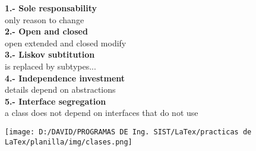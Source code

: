 \documentclass[11pt]{beamer}
\begin{document}
\begin{frame}
\textbf{1.- Sole responsability}\\
\textcolor{textoColor}{only reason to change}\\
\textbf{2.- Open and closed}\\
\textcolor{urlColor}{open extended and closed modify}\\
\textbf{3.- Liskov subtitution}\\
\textcolor{urlColor}{
is replaced by subtypes...}\\
\textbf{4.- Independence investment}\\
\textcolor{urlColor}{details depend on abstractions}\\
\textbf{5.- Interface segregation}\\
\textcolor{urlColor}{
a class does not depend on interfaces that do not use}\\
\end{frame}




\begin{frame}
\begin{center}
\texttt{[image: D:/DAVID/PROGRAMAS DE Ing. SIST/LaTex/practicas de LaTex/planilla/img/clases.png]} 
\end{center}
\end{frame}
\end{document}

